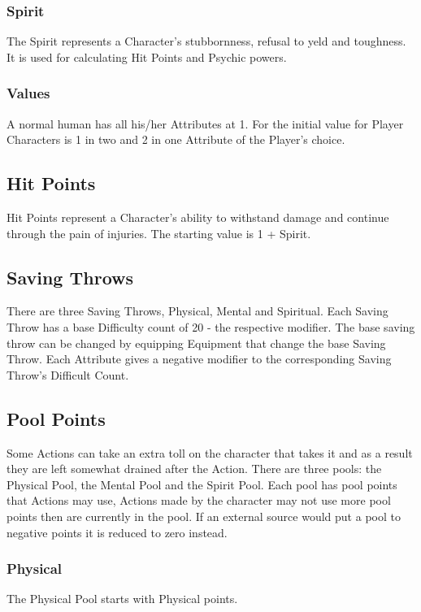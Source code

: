 \documentclass[a4paper,12pt,oneside]{book}
\begin{document}
                \subsubsection{Spirit}
                    The Spirit represents a Character's stubbornness, refusal to yeld and toughness. It is used for calculating Hit Points and Psychic powers.
                \subsubsection{Values}
                    A normal human has all his/her Attributes at 1. For the initial value for Player Characters is 1 in two and 2 in one Attribute of the Player's choice.
            \subsection{Hit Points}
                Hit Points represent a Character's ability to withstand damage and continue through the pain of injuries. The starting value is 1 + Spirit.
            \subsection{Saving Throws}
                There are three Saving Throws, Physical, Mental and Spiritual. Each Saving Throw has a base Difficulty count of 20 - the respective modifier. The base saving throw can be changed by equipping Equipment that change the base Saving Throw. Each Attribute gives a negative modifier to the corresponding Saving Throw's Difficult Count.
            \subsection{Pool Points}
                Some Actions can take an extra toll on the character that takes it and as a result they are left somewhat drained after the Action. There are three pools: the Physical Pool, the Mental Pool and the Spirit Pool. Each pool has pool points that Actions may use, Actions made by the character may not use more pool points then are currently in the pool. If an external source would put a pool to negative points it is reduced to zero instead.
                \subsubsection{Physical}
                    The Physical Pool starts with Physical points.
\end{document}
